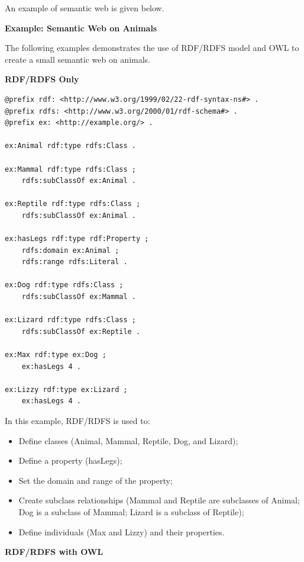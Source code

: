 An example of semantic web is given below.
\begin{mdframed}

\vspace{0.1in}
{\centering \textbf{Example: Semantic Web on Animals}}
\vspace{0.1in}

The following examples demonstrates the use of RDF/RDFS model and OWL to create a small semantic web on animals.

\vspace{0.1in}
\noindent \textbf{RDF/RDFS Only}
\vspace{0.1in}

\begin{lstlisting}
@prefix rdf: <http://www.w3.org/1999/02/22-rdf-syntax-ns#> .
@prefix rdfs: <http://www.w3.org/2000/01/rdf-schema#> .
@prefix ex: <http://example.org/> .

ex:Animal rdf:type rdfs:Class .

ex:Mammal rdf:type rdfs:Class ;
    rdfs:subClassOf ex:Animal .

ex:Reptile rdf:type rdfs:Class ;
    rdfs:subClassOf ex:Animal .

ex:hasLegs rdf:type rdf:Property ;
    rdfs:domain ex:Animal ;
    rdfs:range rdfs:Literal .

ex:Dog rdf:type rdfs:Class ;
    rdfs:subClassOf ex:Mammal .

ex:Lizard rdf:type rdfs:Class ;
    rdfs:subClassOf ex:Reptile .

ex:Max rdf:type ex:Dog ;
    ex:hasLegs 4 .

ex:Lizzy rdf:type ex:Lizard ;
    ex:hasLegs 4 .
\end{lstlisting}

In this example, RDF/RDFS is used to:
\begin{itemize}
  \item Define classes (Animal, Mammal, Reptile, Dog, and Lizard);
  \item Define a property (hasLegs);
  \item Set the domain and range of the property;
  \item Create subclass relationships (Mammal and Reptile are subclasses of Animal; Dog is a subclass of Mammal; Lizard is a subclass of Reptile);
  \item Define individuals (Max and Lizzy) and their properties.
\end{itemize}

\vspace{0.1in}
\noindent \textbf{RDF/RDFS with OWL}
\vspace{0.1in}


\end{mdframed}
